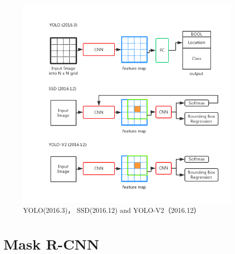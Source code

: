 \documentclass[a4paper,12pt]{report}
\begin{document}
\begin{spacing}{1.5}
\begin{figure}[!h]
	\begin{center}
		\includegraphics[width=0.92\linewidth]{figure//YOLOV2.png}
		\caption{YOLO(2016.3)， SSD(2016.12) and YOLO-V2（2016.12）}
		\label{Fig:7}
	\end{center}
\end{figure}


\end{spacing}

%  
\chapter{Mask R-CNN}
\end{document}
